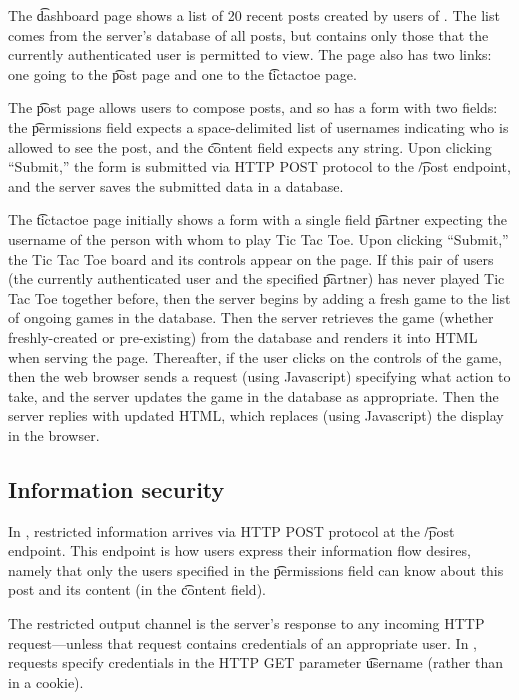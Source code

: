 \begin{refsection}
The \t{dashboard} page shows a list of 20 recent posts created by users of \myapp{}.
%
The list comes from the server's database of all posts,
but contains only those that the currently authenticated user is permitted to view.
%
The page also has two links:
one going to the \t{post} page and one to the \t{tictactoe} page.

The \t{post} page allows users to compose posts, and so has a form with two fields:
the \t{permissions} field expects a space-delimited list of usernames indicating who is allowed to see the post,
and the \t{content} field expects any string.
%
Upon clicking ``Submit,'' the form is submitted via HTTP POST protocol to the \t{/post} endpoint,
and the server saves the submitted data in a database.

The \t{tictactoe} page initially shows a form with a single field \t{partner} expecting the username of the person with whom to play Tic Tac Toe.
%
Upon clicking ``Submit,'' the Tic Tac Toe board and its controls appear on the page.
%
If this pair of users
(the currently authenticated user and the specified \t{partner})
has never played Tic Tac Toe together before,
then the server begins by adding a fresh game to the list of ongoing games in the database.
%
Then the server retrieves the game
(whether freshly-created or pre-existing)
from the database and renders it into HTML when serving the page.
%
Thereafter, if the user clicks on the controls of the game,
then the web browser sends a request (using Javascript) specifying what action to take,
and the server updates the game in the database as appropriate.
%
Then the server replies with updated HTML,
which replaces (using Javascript) the display in the browser.

\subsection{Information security}

In \myapp{}, restricted information arrives via HTTP POST protocol at the \t{/post} endpoint.
%
This endpoint is how users express their information flow desires,
namely that only the users specified in the \t{permissions} field can know about this post and its content (in the \t{content} field).

The restricted output channel is the server's response to any incoming HTTP request---unless
that request contains credentials of an appropriate user.
%
In \myapp{}, requests specify credentials in the HTTP GET parameter \t{username}
(rather than in a cookie).


\end{refsection}
